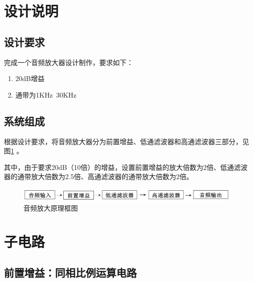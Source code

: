 \documentclass[12pt]{article}
\begin{document}
\setcounter{page}{1}
\section{设计说明}
\setcounter{equation}{0}
\setcounter{table}{0}
\setcounter{figure}{0}
\subsection{设计要求}
完成一个音频放大器设计制作，要求如下：
\begin{enumerate}
  \item 20dB增益
  \item 通带为1KHz~30KHz
\end{enumerate}
\subsection{系统组成}
根据设计要求，将音频放大器分为前置增益、低通滤波器和高通滤波器三部分，见图\ref{yuanli}
。\par
其中，由于要求20dB（10倍）的增益，设置前置增益的放大倍数为2倍、低通滤波器的通带放大倍数为2.5倍、高通滤波器的通带放大倍数为2倍。
\begin{figure}[htbp]
  \centering
  \includegraphics[width=\textwidth]{picture/PPT1}
  \caption{音频放大原理框图}\label{yuanli}
\end{figure}
\section{子电路}
\setcounter{equation}{0}
\setcounter{table}{0}
\setcounter{figure}{0}
\subsection{前置增益：同相比例运算电路}
\end{document}
